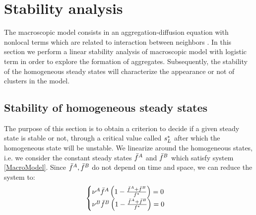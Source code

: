 \section{Stability analysis}

The macroscopic model consists in an aggregation-diffusion equation with nonlocal terms which are related to interaction between neighbors .
In this section we perform a linear stability analysis of macroscopic model with logistic term in order to explore the formation of aggregates. Subsequently, the stability of the homogeneous steady states will characterize the appearance or not of clusters in the model.

\subsection{Stability of homogeneous steady states}
The purpose of this section is to obtain a criterion to decide if a given steady state is stable or not, through a critical value called ${s^{*}_{L}}$ after which the homogeneous state will be unstable.
We linearize around the homogeneous states, i.e. we consider the constant steady states ${\bar{f}^A}$ and ${\bar{f}^B}$ which satisfy system \eqref{MacroModel}. 
% 
Since ${\bar{f}^A},{\bar{f}^B}$ do not depend on time and space, we can reduce the system to:%
\begin{equation}\label{reducedMacroModel}
\begin{cases}
	{\nu^A}{\bar{f}^A}\left( 1-\frac{{\bar{f}^A}+{\bar{f}^B}}{{f^{*}}} \right)=0 \\
	{\nu^B}{\bar{f}^B}\left( 1-\frac{{\bar{f}^A}+{\bar{f}^B}}{{f^{*}}} \right)=0
\end{cases}
\end{equation}
